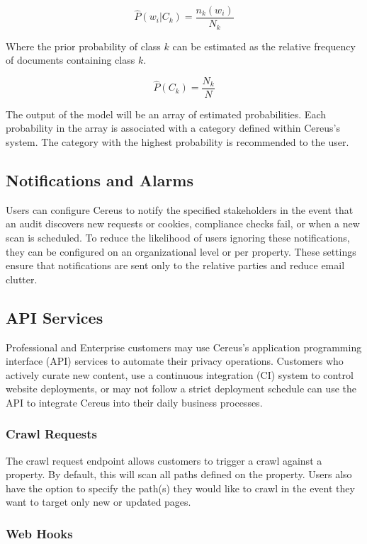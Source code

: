\[
  \hat{P}(w_{i}|C_{k}) = \frac{n_{k}(w_{i})}{N_{k}}
\]

Where the prior probability of class \(k\) can be estimated as the relative frequency of documents containing class \(k\).

\[
  \hat{P}(C_{k}) = \frac{N_{k}}{N}
\]

The output of the model will be an array of estimated probabilities. Each probability in the array is associated with a category defined within Cereus's system. The category with the highest probability is recommended to the user.

\subsection{Notifications and Alarms}

Users can configure Cereus to notify the specified stakeholders in the event that an audit discovers new requests or cookies, compliance checks fail, or when a new scan is scheduled. To reduce the likelihood of users ignoring these notifications, they can be configured on an organizational level or per property. These settings ensure that notifications are sent only to the relative parties and reduce email clutter.

\subsection{API Services}

Professional and Enterprise customers may use Cereus's application programming interface (API) services to automate their privacy operations. Customers who actively curate new content, use a continuous integration (CI) system to control website deployments, or may not follow a strict deployment schedule can use the API to integrate Cereus into their daily business processes.

\subsubsection*{Crawl Requests}

The crawl request endpoint allows customers to trigger a crawl against a property. By default, this will scan all paths defined on the property. Users also have the option to specify the path(s) they would like to crawl in the event they want to target only new or updated pages.

\subsubsection*{Web Hooks}

